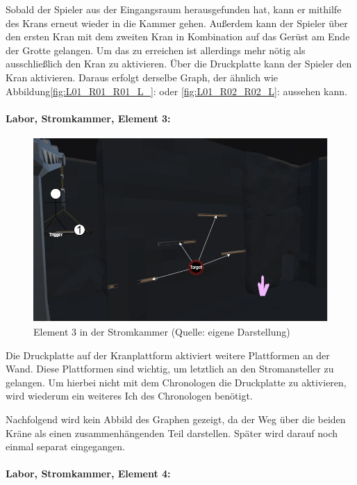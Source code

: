 Sobald der Spieler aus der Eingangsraum herausgefunden hat, kann er mithilfe des Krans erneut wieder in die Kammer gehen. Außerdem kann der Spieler über den ersten Kran mit dem zweiten Kran in Kombination auf das Gerüst am Ende der Grotte gelangen. Um das zu erreichen ist allerdings mehr nötig als ausschließlich den Kran zu aktivieren. Über die Druckplatte kann der Spieler den Kran aktivieren. Daraus erfolgt derselbe Graph, der ähnlich wie Abbildung\ref{fig:L01_R01_R01_L_}:  oder \ref{fig:L01_R02_R02_L}:  aussehen kann.

\paragraph{Labor, Stromkammer, Element 3:}\label{p:lse3}

\begin{figure}[ht]
\centering
\includegraphics[width=0.8\linewidth]{content/pictures/Raetsel-L02_R01_R03.jpg}
\caption{Element 3 in der Stromkammer (Quelle: eigene Darstellung)}
\label{fig:L02_R01_R03}
\end{figure}

Die Druckplatte auf der Kranplattform aktiviert weitere Plattformen an der Wand. Diese Plattformen sind wichtig, um letztlich an den Stromansteller zu gelangen. Um hierbei nicht mit dem Chronologen die Druckplatte zu aktivieren, wird wiederum ein weiteres Ich des Chronologen benötigt. 

Nachfolgend wird kein Abbild des Graphen gezeigt, da der Weg über die beiden Kräne als einen zusammenhängenden Teil darstellen. Später wird darauf noch einmal separat eingegangen.

\paragraph{Labor, Stromkammer, Element 4:}\label{p:lse4}

